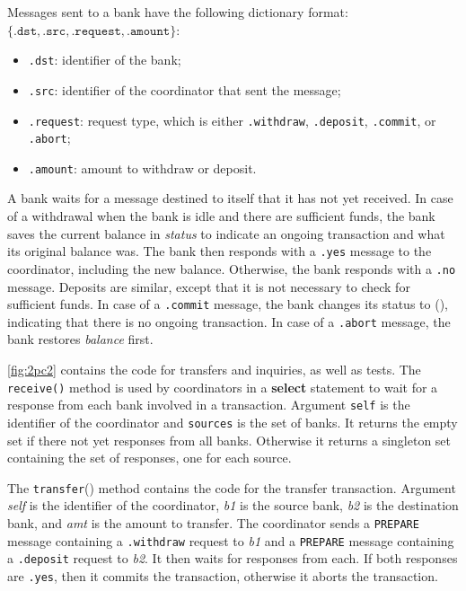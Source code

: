 \documentclass{report}
\begin{document}
\noindent
Messages sent to a bank have the following dictionary format:
$\{ \mathtt{.dst}, \mathtt{.src}, \mathtt{.request}, \mathtt{.amount} \}$:
\begin{itemize}
\item \texttt{.dst}: identifier of the bank;
\item \texttt{.src}: identifier of the coordinator that sent the message;
\item \texttt{.request}: request type, which is either
\texttt{.withdraw}, \texttt{.deposit}, \texttt{.commit}, or \texttt{.abort};
\item \texttt{.amount}: amount to withdraw or deposit.
\end{itemize}

\noindent
A bank waits for a message destined to itself that it has not yet received.
In case of a withdrawal when the bank is idle and there are sufficient
funds, the bank saves the current balance in \textit{status} to indicate
an ongoing transaction and what its original balance was.
The bank then responds with a \texttt{.yes} message to the coordinator,
including the new balance.
Otherwise, the bank responds with a \texttt{.no} message.
Deposits are similar, except that it is not necessary to check for
sufficient funds.
In case of a \texttt{.commit} message, the bank changes its status
to (), indicating that there is no ongoing transaction.  In case of
a \texttt{.abort} message, the bank restores \textit{balance} first.

\autoref{fig:2pc2} contains the code for transfers and inquiries, as well
as tests.
The \texttt{receive()} method is used by coordinators in a \textbf{select}
statement to wait for a response from each bank involved in a transaction.
Argument \texttt{self} is the
identifier of the coordinator and \texttt{sources} is the set of banks.
It returns the empty set if there not yet responses from all banks.
Otherwise it returns a singleton set containing the set of responses,
one for each source.

The \texttt{transfer}() method contains the code for the transfer
transaction.  Argument \textit{self} is the identifier of the coordinator,
\textit{b1} is the source bank, \textit{b2} is the destination bank,
and \textit{amt} is the amount to transfer.
The coordinator sends a \texttt{PREPARE} message containing a
\texttt{.withdraw} request to \textit{b1} and a \texttt{PREPARE}
message containing a \texttt{.deposit} request to \textit{b2}.
It then waits for responses from each.  If both responses are
\texttt{.yes}, then it commits the transaction, otherwise it aborts
the transaction.
\end{document}
